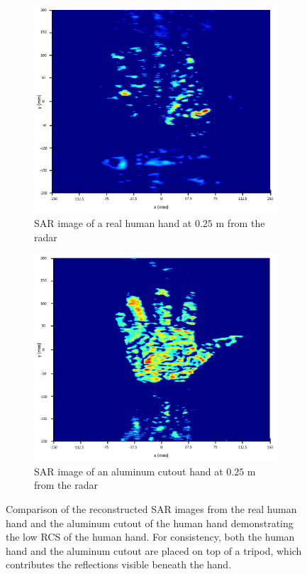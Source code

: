 \documentclass{ieeeaccess}
\begin{document}
\begin{figure}
     \centering
     \begin{subfigure}[b]{0.23\textwidth}
         \centering
         \includegraphics[width=\textwidth]{sar_real_hand.png}
         \caption{SAR image of a real human hand at $0.25$ m from the radar}
         \label{fig:sar_real_hand}
     \end{subfigure}
     \hfill
     \begin{subfigure}[b]{0.23\textwidth}
         \centering
         \includegraphics[width=\textwidth]{sar_foil_hand.png}
         \caption{SAR image of an aluminum cutout hand at $0.25$ m from the radar}
         \label{fig:sar_foil_hand}
     \end{subfigure}
        \caption{Comparison of the reconstructed SAR images from the real human hand and the aluminum cutout of the human hand demonstrating the low RCS of the human hand. For consistency, both the human hand and the aluminum cutout are placed on top of a tripod, which contributes the reflections visible beneath the hand.}
        \label{fig:sar_images}
\end{figure}
\end{document}
